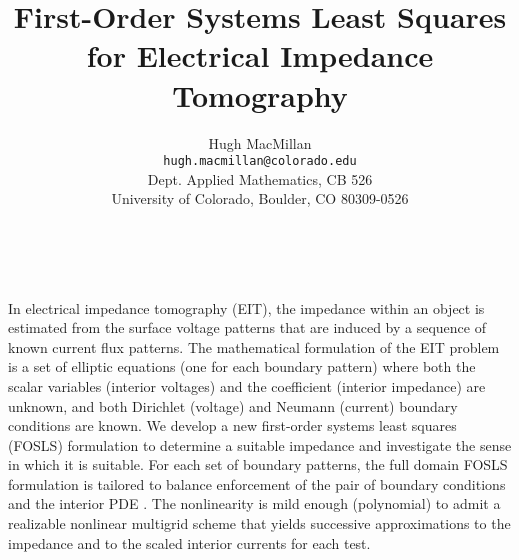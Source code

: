 \documentclass[11pt]{article}
\date{ ~ \hspace{-4mm}}
\title{First-Order Systems Least Squares for Electrical Impedance Tomography  }
\author{Hugh MacMillan \\ {\tt  hugh.macmillan@colorado.edu} \\ Dept. Applied Mathematics, CB 526 \\ University of Colorado, Boulder, CO 80309-0526}
\begin{document}
\maketitle
\thispagestyle{empty}





 


In electrical impedance tomography (EIT), the impedance within an
object is estimated from the surface voltage patterns that are
induced by a sequence of known current flux patterns. The
mathematical formulation of the EIT problem is a set of elliptic
equations (one for each boundary pattern) where both the scalar
variables (interior voltages) and the coefficient (interior
impedance) are unknown, and both Dirichlet (voltage) and Neumann
(current) boundary conditions are known. We develop a new
first-order systems least squares (FOSLS) formulation to determine
a suitable impedance and investigate the sense in which it is
suitable. For each set of boundary patterns, the full domain
FOSLS formulation is tailored to balance enforcement of the pair
of boundary conditions and the interior PDE .  The nonlinearity is
mild enough (polynomial) to admit a realizable nonlinear multigrid
scheme that yields successive approximations to the impedance and
to the scaled interior currents for each test.
\end{document}
